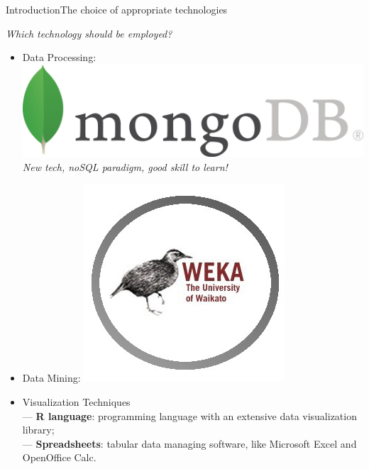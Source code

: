 \begin{frame}{Introduction}{The choice of appropriate technologies}

	\centering\textit{Which technology should be employed?} \vspace{0,3cm}

	\begin{block}{}
	    \begin{itemize}
		    \item<1-> \alert{Data Processing}: \hspace{0.2cm} \includegraphics[scale=0.18, trim=0 0.8cm 0 0]{../thesis/img/mongodb.png} \\\vspace{0.2cm} \emph{New tech, noSQL paradigm, good skill to learn!} \vspace{0.4cm}
		    \item<2-> \alert{Data Mining}: \hspace{0.2cm} \includegraphics[scale=0.18, trim=0 0.8cm 0 0]{../thesis/img/weka_noback.png}
			\item<3-> \alert{Visualization Techniques} \\
			--- \textbf{R language}: programming language with an extensive data visualization library; \\
			--- \textbf{Spreadsheets}: tabular data managing software, like Microsoft Excel and OpenOffice Calc.
	    \end{itemize}
    \end{block}

\end{frame}
